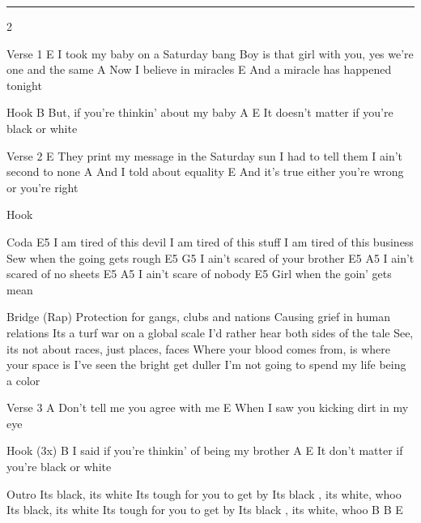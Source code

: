 \noindent\rule{\columnwidth}{1pt}

\begin{multicols}{2}
\begin{lstsong}
Verse 1
E
I took my baby on a Saturday bang
Boy is that girl with you, yes we're one and the same
    A
Now I believe in miracles
                             E
And a miracle has happened tonight
 
Hook
               B
But, if you're thinkin' about my baby
           A                         E
It doesn't matter if you're black or white

Verse 2
E
They print my message in the Saturday sun
I had to tell them I ain't second to none
      A
And I told about equality
                                            E
And it's true either you're wrong or you're right

Hook
\end{lstsong}
\columnbreak
\begin{lstsong}
Coda
E5
I am tired of this devil
I am tired of this stuff
I am tired of this business
Sew when the going gets rough
E5                             G5
I ain't scared of your brother
E5                          A5
I ain't scared of no sheets
E5                       A5
I ain't scare of nobody
E5
Girl when the goin' gets mean

Bridge (Rap)
Protection for gangs, clubs and nations
Causing grief in human relations
Its a turf war on a global scale
I'd rather hear both sides of the tale
See, its not about races, just places, faces
Where your blood comes from, is where your space is
I've seen the bright get duller
I'm not going to spend my life being a color

Verse 3
      A
Don't tell me you agree with me
                                  E
When I saw you kicking dirt in my eye

Hook (3x)
                 B
I said if you're thinkin' of being my brother
         A                         E
It don't matter if you're black or white

Outro
Its black, its white
Its tough for you to get by
Its black , its white, whoo
Its black, its white
Its tough for you to get by
Its black , its white, whoo 
B B E
\end{lstsong}
\end{multicols}
\newpage

